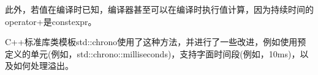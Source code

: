 此外，若值在编译时已知，编译器甚至可以在编译时执行值计算，因为持续时间的operator+是constexpr。

C++标准库类模板std::chrono使用了这种方法，并进行了一些改进，例如使用预定义的单元(例如，std::chrono::milliseconds)，支持字面时间段(例如，10ms)，以及如何处理溢出。































